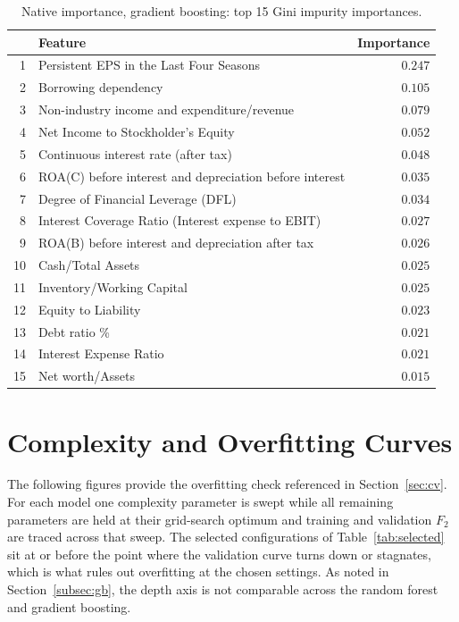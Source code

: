 \begin{table}[htbp]
  \centering
  \caption{Native importance, gradient boosting: top 15 Gini impurity importances.}
  \label{tab:native-gb}
  \small
  \begin{tabular}{rlr}
    \toprule
    & \textbf{Feature} & \textbf{Importance} \\
    \midrule
    1  & Persistent EPS in the Last Four Seasons     & $0.247$ \\
    2  & Borrowing dependency                        & $0.105$ \\
    3  & Non-industry income and expenditure/revenue & $0.079$ \\
    4  & Net Income to Stockholder's Equity          & $0.052$ \\
    5  & Continuous interest rate (after tax)        & $0.048$ \\
    6  & ROA(C) before interest and depreciation before interest & $0.035$ \\
    7  & Degree of Financial Leverage (DFL)          & $0.034$ \\
    8  & Interest Coverage Ratio (Interest expense to EBIT) & $0.027$ \\
    9  & ROA(B) before interest and depreciation after tax & $0.026$ \\
    10 & Cash/Total Assets                           & $0.025$ \\
    11 & Inventory/Working Capital                   & $0.025$ \\
    12 & Equity to Liability                         & $0.023$ \\
    13 & Debt ratio \%                               & $0.021$ \\
    14 & Interest Expense Ratio                      & $0.021$ \\
    15 & Net worth/Assets                            & $0.015$ \\
    \bottomrule
  \end{tabular}
\end{table}

\section{Complexity and Overfitting Curves}
\label{sec:app-complexity}

The following figures provide the overfitting check referenced in
Section~\ref{sec:cv}. For each model one complexity parameter is swept while all
remaining parameters are held at their grid-search optimum and training and
validation $F_2$ are traced across that sweep. The selected configurations of
Table~\ref{tab:selected} sit at or before the point where the validation curve turns
down or stagnates, which is what rules out overfitting at the chosen settings. As noted in
Section~\ref{subsec:gb}, the depth axis is not comparable across the random forest
and gradient boosting.

